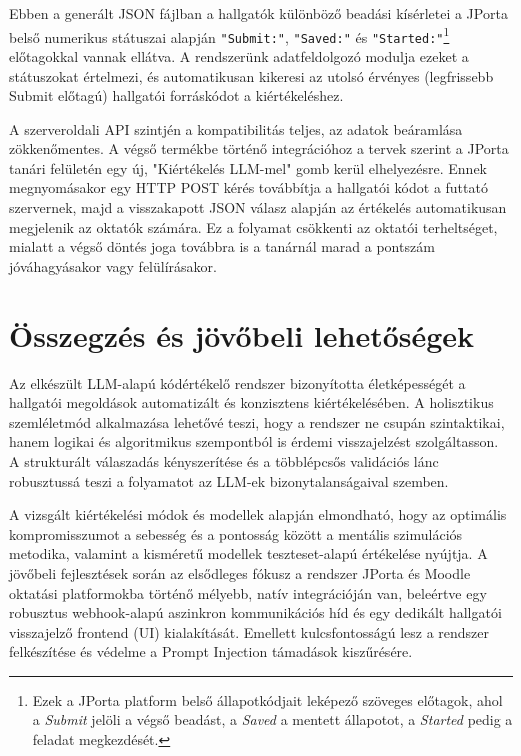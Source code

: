 \documentclass[12pt,a4paper]{article}
\begin{document}
Ebben a generált JSON fájlban a hallgatók különböző beadási kísérletei a JPorta belső numerikus státuszai alapján \texttt{"Submit:"}, \texttt{"Saved:"} és \texttt{"Started:"}\footnote{Ezek a JPorta platform belső állapotkódjait leképező szöveges előtagok, ahol a \textit{Submit} jelöli a végső beadást, a \textit{Saved} a mentett állapotot, a \textit{Started} pedig a feladat megkezdését.} előtagokkal vannak ellátva. A rendszerünk adatfeldolgozó modulja ezeket a státuszokat értelmezi, és automatikusan kikeresi az utolsó érvényes (legfrissebb Submit előtagú) hallgatói forráskódot a kiértékeléshez.

A szerveroldali API szintjén a kompatibilitás teljes, az adatok beáramlása zökkenőmentes. A végső termékbe történő integrációhoz a tervek szerint a JPorta tanári felületén egy új, "Kiértékelés LLM-mel" gomb kerül elhelyezésre. Ennek megnyomásakor egy HTTP POST kérés továbbítja a hallgatói kódot a futtató szervernek, majd a visszakapott JSON válasz alapján az értékelés automatikusan megjelenik az oktatók számára. Ez a folyamat csökkenti az oktatói terheltséget, mialatt a végső döntés joga továbbra is a tanárnál marad a pontszám jóváhagyásakor vagy felülírásakor.

\section{Összegzés és jövőbeli lehetőségek}
\label{sec:osszegzes}
Az elkészült LLM-alapú kódértékelő rendszer bizonyította életképességét a hallgatói megoldások automatizált és konzisztens kiértékelésében. A holisztikus szemléletmód alkalmazása lehetővé teszi, hogy a rendszer ne csupán szintaktikai, hanem logikai és algoritmikus szempontból is érdemi visszajelzést szolgáltasson. A strukturált válaszadás kényszerítése és a többlépcsős validációs lánc robusztussá teszi a folyamatot az LLM-ek bizonytalanságaival szemben.

A vizsgált kiértékelési módok és modellek alapján elmondható, hogy az optimális kompromisszumot a sebesség és a pontosság között a mentális szimulációs metodika, valamint a kisméretű modellek teszteset-alapú értékelése nyújtja. A jövőbeli fejlesztések során az elsődleges fókusz a rendszer JPorta és Moodle oktatási platformokba történő mélyebb, natív integrációján van, beleértve egy robusztus webhook-alapú aszinkron kommunikációs híd és egy dedikált hallgatói visszajelző frontend (UI) kialakítását. Emellett kulcsfontosságú lesz a rendszer felkészítése és védelme a Prompt Injection támadások kiszűrésére.
\end{document}
